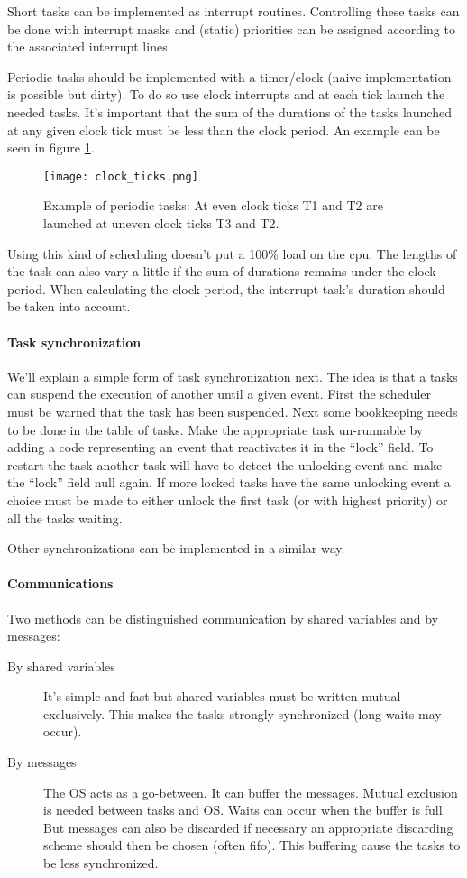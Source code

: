 \documentclass[../main.tex]{subfiles}
\begin{document}
Short tasks can be implemented as interrupt routines. 
Controlling these tasks can be done with interrupt masks and (static) priorities can be assigned according to the associated interrupt lines.

Periodic tasks should be implemented with a timer/clock (naive implementation is possible but dirty).
To do so use clock interrupts and at each tick launch the needed tasks.
It's important that the sum of the durations of the tasks launched at any given clock tick must be less than the clock period. 
An example can be seen in figure \ref{f:perd_ex}.

\begin{figure}[H]
	\centering
	\texttt{[image: clock\_ticks.png]}
	\caption{Example of periodic tasks: At even clock ticks T1 and T2 are launched at uneven clock ticks T3 and T2.}
	\label{f:perd_ex}
\end{figure}

Using this kind of scheduling doesn't put a 100\% load on the cpu.
The lengths of the task can also vary a little if the sum of durations remains under the clock period.
When calculating the clock period, the interrupt task's duration should be taken into account.

\paragraph{Task synchronization}
We'll explain a simple form of  task synchronization next. 
The idea is that a tasks can suspend the execution of another until a given event.
First the scheduler must be warned that the task has been suspended.
Next some bookkeeping needs to be done in the table of tasks.
Make the appropriate task un-runnable by adding a code representing an event that reactivates it in the ``lock'' field.
To restart the task another task will have to detect the unlocking event and make the ``lock'' field null again. 
If more locked tasks have the same unlocking event a choice must be made to either unlock the first task (or with highest priority) or all the tasks waiting. 

Other synchronizations can be implemented in a similar way.

\paragraph{Communications}
Two methods can be distinguished communication by shared variables and by messages:
\begin{description}
	\item[By shared variables] It's simple and fast but shared variables must be written mutual exclusively. This makes the tasks strongly synchronized (long waits may occur).
	\item[By messages] The OS acts as a go-between. It can buffer the messages. Mutual exclusion is needed between tasks and OS. Waits can occur when the buffer is full. But messages can also be discarded if necessary an appropriate discarding scheme should then be chosen (often fifo). This buffering cause the tasks to be less synchronized.
\end{description} 
\end{document}
